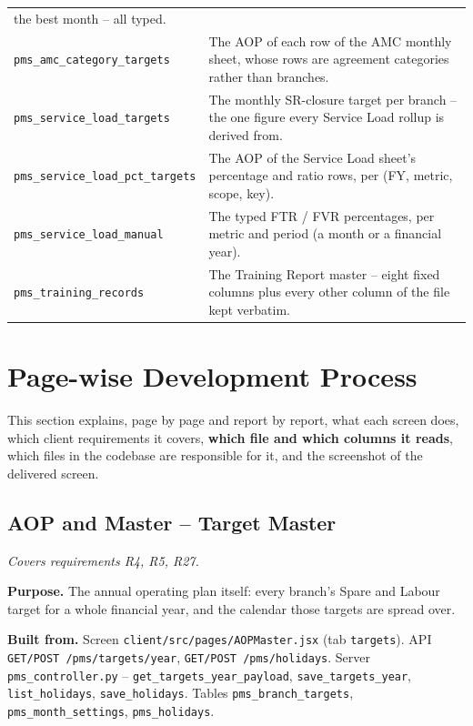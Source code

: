\documentclass[11pt,a4paper]{article}
\newcommand{\covers}[1]{\textit{Covers requirements #1.}\par}
\newcommand{\purpose}[1]{\textbf{Purpose.} #1\par}
\newcommand{\builtfrom}[1]{\textbf{Built from.} #1\par}
\newcommand{\file}[1]{\texttt{\small #1}}
\begin{document}
\begin{longtable}{@{}p{5.2cm}p{10.0cm}@{}}
the best month -- all typed. \\
\file{pms\_amc\_category\_targets} & The AOP of each row of the AMC monthly sheet, whose
rows are agreement categories rather than branches. \\
\file{pms\_service\_load\_targets} & The monthly SR-closure target per branch -- the one
figure every Service Load rollup is derived from. \\
\file{pms\_service\_load\_pct\_targets} & The AOP of the Service Load sheet's percentage
and ratio rows, per (FY, metric, scope, key). \\
\file{pms\_service\_load\_manual} & The typed FTR / FVR percentages, per metric and
period (a month or a financial year). \\
\file{pms\_training\_records} & The Training Report master -- eight fixed columns plus
every other column of the file kept verbatim. \\
\end{longtable}

\section{Page-wise Development Process}

This section explains, page by page and report by report, what each screen does, which
client requirements it covers, \textbf{which file and which columns it reads}, which files
in the codebase are responsible for it, and the screenshot of the delivered screen.

\subsection{AOP and Master -- Target Master}
\covers{R4, R5, R27}

\purpose{The annual operating plan itself: every branch's Spare and Labour target for a
whole financial year, and the calendar those targets are spread over.}

\builtfrom{Screen \file{client/src/pages/AOPMaster.jsx} (tab \texttt{targets}).
API \texttt{GET/POST /pms/targets/year}, \texttt{GET/POST /pms/holidays}.
Server \file{pms\_controller.py} -- \texttt{get\_targets\_year\_payload},
\texttt{save\_targets\_year}, \texttt{list\_holidays}, \texttt{save\_holidays}.
Tables \file{pms\_branch\_targets}, \file{pms\_month\_settings}, \file{pms\_holidays}.}
\end{document}
